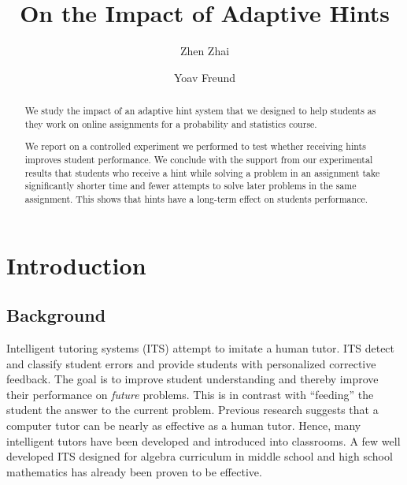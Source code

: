\documentclass{llncs2e/llncs}
\title{On the Impact of Adaptive Hints}
\author{Zhen Zhai\inst{1} \and Yoav Freund\inst{2}}
\institute{UC San Diego \email{zzhai@eng.ucsd.edu} \and UC San Diego \email{yfreund@eng.ucsd.edu}}
\begin{document}
\maketitle

\begin{abstract}

We study the impact of an adaptive hint system that we designed to help students as they work on online assignments for a
probability and statistics course.

We report on a controlled experiment we performed to test whether receiving hints improves student performance. We conclude with the support from our experimental results that students who receive a hint while solving a problem in an assignment take significantly shorter time and fewer attempts to solve later problems in the same assignment. This shows that hints have a long-term effect on students performance.

\end{abstract}



\section{Introduction}



\subsection*{Background}
Intelligent tutoring systems (ITS)\cite{Anderson1995} attempt to
imitate a human tutor.  ITS detect and classify student errors and
provide students with personalized corrective feedback. The goal is to
improve student understanding and thereby improve their performance on
{\em future} problems. This is in contrast with ``feeding'' the
student the answer to the current problem.  Previous research suggests
that a computer tutor can be nearly as effective as a human
tutor\cite{Vanlehn2011}. Hence, many intelligent tutors have been
developed and introduced into classrooms. A few well developed ITS
designed for algebra curriculum in middle school and high school
mathematics has already been proven to be
effective\cite{Koedinger1997,John2014}.
\end{document}
